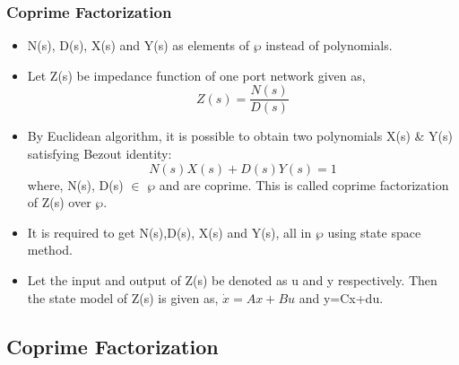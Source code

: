 \documentclass{beamer}
\begin{document}
\begin{frame}
\frametitle{Coprime Factorization}

\begin{small}
        \begin{itemize}
	\item N(s), D(s), X(s) and Y(s) as elements of $\wp$ instead of polynomials.
         \item Let Z(s) be impedance function of one port network given as,
\begin{equation}
Z(s)=\frac{N(s)}{D(s)}
\end{equation}

        \item By Euclidean algorithm, it is possible to obtain two polynomials X(s) \& Y(s) satisfying Bezout identity:
\begin{equation}
N(s)X(s)+D(s)Y(s)=1
\end{equation}
where, N(s), D(s) $\in$ $\wp$ and are coprime. This is called coprime factorization of Z(s) over $\wp$.
\item It is required to get N(s),D(s), X(s) and Y(s), all in $\wp$ using state space method. 
\item Let the input and output of Z(s) be denoted as u and y respectively. Then the state model of Z(s) is given as, $\dot{x}=Ax+Bu$ and y=Cx+du. 
\end{itemize}
\end{small}
\end{frame}





\subsection*{Coprime Factorization}
\end{document}
